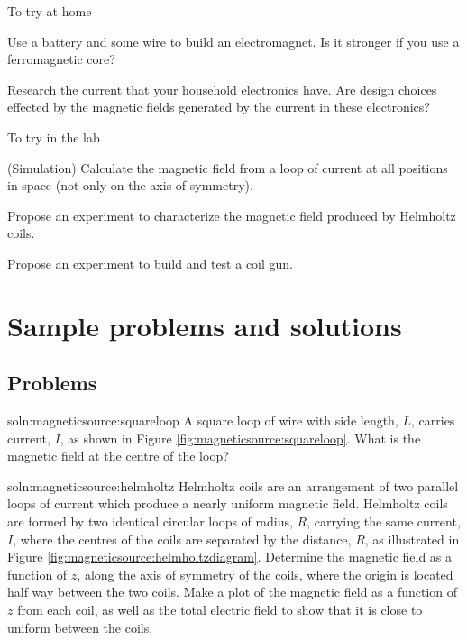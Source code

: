 \begin{chapteractivity}{To try at home}
{
\item Use a battery and some wire to build an electromagnet. Is it stronger if you use a ferromagnetic core?
\item Research the current that your household electronics have. Are design choices effected by the magnetic fields generated by the current in these electronics?
}
\end{chapteractivity}

\begin{chapteractivity}{To try in the lab}
{
\item (Simulation) Calculate the magnetic field from a loop of current at all positions in space (not only on the axis of symmetry). 
\item Propose an experiment to characterize the magnetic field produced by Helmholtz coils.
\item Propose an experiment to build and test a coil gun.
}
\end{chapteractivity}

\newpage
\section{Sample problems and solutions}
\subsection{Problems}
\begin{problem}{soln:magneticsource:squareloop}
{\label{prob:magneticsource:squareloop} 
A square loop of wire with side length, $L$, carries current, $I$, as shown in Figure \ref{fig:magneticsource:squareloop}. What is the magnetic field at the centre of the loop?
}
\end{problem}

\begin{problem}{soln:magneticsource:helmholtz}{\label{prob:magneticsource:helmholtz} 
Helmholtz coils are an arrangement of two parallel loops of current which produce a nearly uniform magnetic field. Helmholtz coils are formed by two identical circular loops of radius, $R$, carrying the same current, $I$, where the centres of the coils are separated by the distance, $R$, as illustrated in Figure \ref{fig:magneticsource:helmholtzdiagram}. Determine the magnetic field as a function of $z$, along the axis of symmetry of the coils, where the origin is located half way between the two coils. Make a plot of the magnetic field as a function of $z$ from each coil, as well as the total electric field to show that it is close to uniform between the coils.
}
\end{problem}

